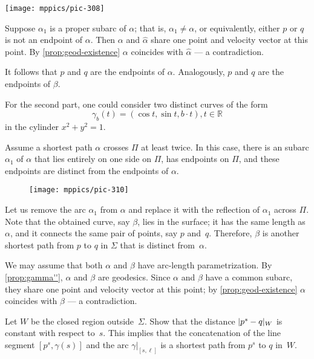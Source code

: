 \begin{multicols}{2}
\begin{Figure}
\vskip-0mm
\centering
\texttt{[image: mppics/pic-308]}
\vskip0mm
\end{Figure}

Suppose $\alpha_1$ is a proper subarc of $\alpha$;
that is, $\alpha_1\ne\alpha$, or equivalently, either $p$ or $q$ is not an endpoint of $\alpha$.
Then $\alpha$ and $\hat\alpha$ share one point and velocity vector at this point.
By \ref{prop:geod-existence} $\alpha$ coincides with $\hat\alpha$ --- a contradiction.

It follows that $p$ and $q$ are the endpoints of $\alpha$.
Analogously, $p$ and $q$ are the endpoints of $\beta$.

For the second part, one could consider two distinct curves of the form 
\[ \gamma_b(t) = ( \cos t , \sin t , b\cdot t ) , t \in \mathbb{R} \]
in the cylinder $x^2 + y^2 =1$.

Assume a shortest path $\alpha$ crosses $\Pi$ at least twice.
In this case, there is an subarc $\alpha_1$ of $\alpha$ that lies entirely on one side
 on $\Pi$, has endpoints on $\Pi$, and these endpoints are distinct from the endpoints of $\alpha$.
 
\begin{wrapfigure}{r}{38 mm}
\vskip-4mm
\centering
\texttt{[image: mppics/pic-310]}
\vskip0mm
\end{wrapfigure}

Let us remove the arc $\alpha_1$ from $\alpha$ and replace it with the reflection of $\alpha_1$ across $\Pi$.
Note that the obtained curve, say $\beta$, lies in the surface;
it has the same length as $\alpha$, and it connects the same pair of points, say $p$ and~$q$.
Therefore, $\beta$ is another shortest path from $p$ to $q$ in $\Sigma$ that is distinct from~$\alpha$.

We may assume that both $\alpha$ and $\beta$ have arc-length parametrization.
By \ref{prop:gamma''}, $\alpha$ and $\beta$ are geodesics.
Since $\alpha$ and $\beta$ have a common subarc, they share one point and velocity vector at this point;
by \ref{prop:geod-existence} $\alpha$ coincides with $\beta$ --- a contradiction.

Let $W$ be the closed region outside~$\Sigma$.
Show that the distance $\dist{p^s}{q}W$ is constant with respect to~$s$.
This implies that the concatenation of the line segment $[p^s,\gamma(s)]$ and the arc $\gamma|_{[s,\ell]}$ is a shortest path from $p^s$ to $q$ in~$W$.


\end{multicols}
